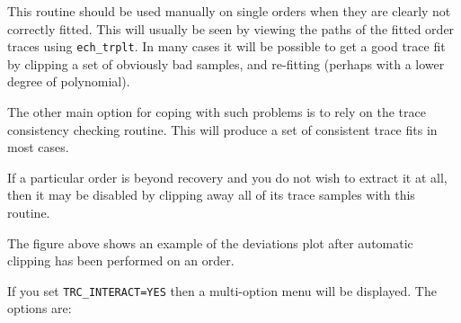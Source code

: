 \documentclass[11pt,twoside]{article}
\newcommand{\htmlref}[2]{#1}
\newcommand{\sunspec}[2]{#1}
\renewcommand{\sunspec}[2]{#2}
\newcommand{\myindex}[1]{\index{#1}}
\renewcommand{\myindex}[1]{}
\begin{document}
This routine should be used manually on single orders when they are
clearly not correctly fitted. This will usually be seen by viewing the
paths of the fitted order traces using
\htmlref{{\tt ech\_trplt}}{ech_trplt}\@. In many cases
it will be possible to get a good trace fit by clipping a set of obviously
bad samples, and re-fitting (perhaps with a lower degree of polynomial).

The other main option for coping with such problems is to rely on the trace
consistency checking routine.  This will produce a set of consistent
trace fits in most cases.
\myindex{Order!disabling}
If a particular order is beyond recovery and you do not wish to extract it
at all, then it may be disabled by clipping away all of its trace samples
with this routine.

\sunspec{Figure~\ref{fi_tclip}}{The figure above}
shows an example of the deviations plot after
automatic clipping has been performed on an order.

If you set {\tt TRC\_INTERACT=YES} then a multi-option menu will be displayed.
The options are:
\end{document}
